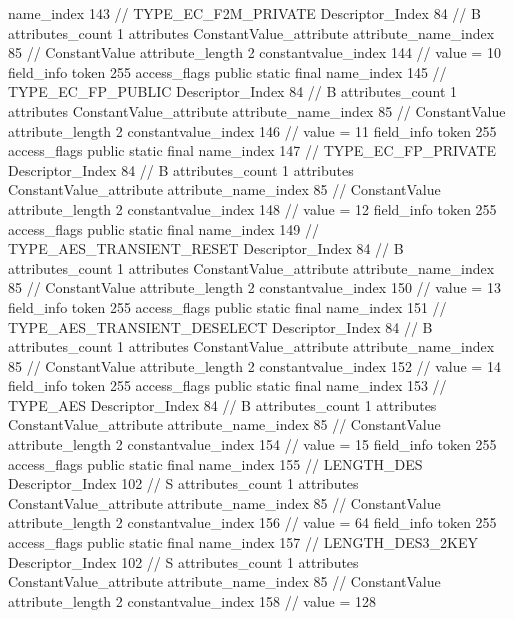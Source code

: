 {{{{{				name_index	143		// TYPE_EC_F2M_PRIVATE
				Descriptor_Index	84		// B
				attributes_count	1
				attributes {
				ConstantValue_attribute {
					attribute_name_index	85		// ConstantValue
					attribute_length	2
					constantvalue_index	144		// value = 10
				}
				}
			}
			field_info {
				token	255
				access_flags	public static final
				name_index	145		// TYPE_EC_FP_PUBLIC
				Descriptor_Index	84		// B
				attributes_count	1
				attributes {
				ConstantValue_attribute {
					attribute_name_index	85		// ConstantValue
					attribute_length	2
					constantvalue_index	146		// value = 11
				}
				}
			}
			field_info {
				token	255
				access_flags	public static final
				name_index	147		// TYPE_EC_FP_PRIVATE
				Descriptor_Index	84		// B
				attributes_count	1
				attributes {
				ConstantValue_attribute {
					attribute_name_index	85		// ConstantValue
					attribute_length	2
					constantvalue_index	148		// value = 12
				}
				}
			}
			field_info {
				token	255
				access_flags	public static final
				name_index	149		// TYPE_AES_TRANSIENT_RESET
				Descriptor_Index	84		// B
				attributes_count	1
				attributes {
				ConstantValue_attribute {
					attribute_name_index	85		// ConstantValue
					attribute_length	2
					constantvalue_index	150		// value = 13
				}
				}
			}
			field_info {
				token	255
				access_flags	public static final
				name_index	151		// TYPE_AES_TRANSIENT_DESELECT
				Descriptor_Index	84		// B
				attributes_count	1
				attributes {
				ConstantValue_attribute {
					attribute_name_index	85		// ConstantValue
					attribute_length	2
					constantvalue_index	152		// value = 14
				}
				}
			}
			field_info {
				token	255
				access_flags	public static final
				name_index	153		// TYPE_AES
				Descriptor_Index	84		// B
				attributes_count	1
				attributes {
				ConstantValue_attribute {
					attribute_name_index	85		// ConstantValue
					attribute_length	2
					constantvalue_index	154		// value = 15
				}
				}
			}
			field_info {
				token	255
				access_flags	public static final
				name_index	155		// LENGTH_DES
				Descriptor_Index	102		// S
				attributes_count	1
				attributes {
				ConstantValue_attribute {
					attribute_name_index	85		// ConstantValue
					attribute_length	2
					constantvalue_index	156		// value = 64
				}
				}
			}
			field_info {
				token	255
				access_flags	public static final
				name_index	157		// LENGTH_DES3_2KEY
				Descriptor_Index	102		// S
				attributes_count	1
				attributes {
				ConstantValue_attribute {
					attribute_name_index	85		// ConstantValue
					attribute_length	2
					constantvalue_index	158		// value = 128
}}}}}}}
